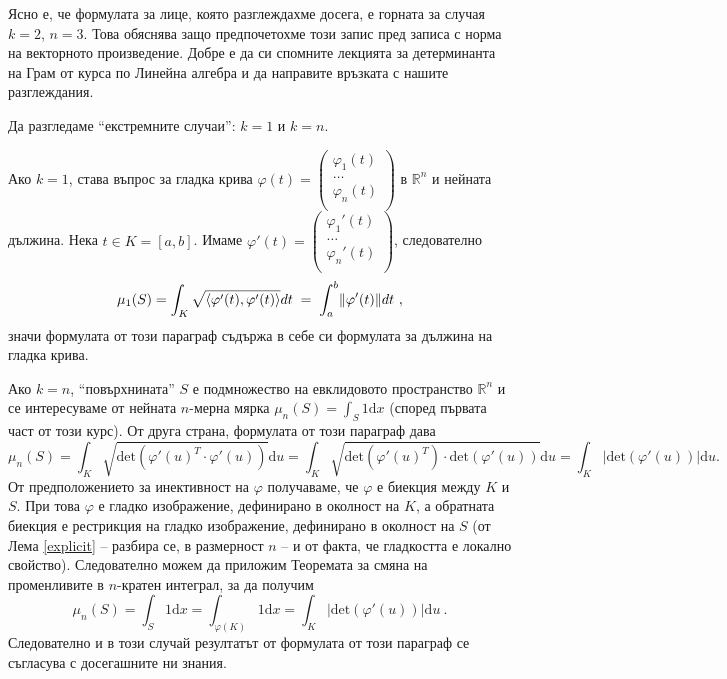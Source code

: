 \documentclass[11pt]{article}
\numberwithin{equation}{section}
\numberwithin{figure}{section}
\numberwithin{table}{section}
\theoremstyle{plain}
\theoremstyle{definition}
\theoremstyle{remark}
\theoremstyle{definition}
\theoremstyle{remark}
\theoremstyle{plain}
\theoremstyle{definition}
\theoremstyle{definition}
\theoremstyle{plain}
\theoremstyle{plain}
\theoremstyle{plain}
\theoremstyle{definition}
\theoremstyle{plain}
\DeclarePairedDelimiter\norm{\lVert}{\rVert}
\newcommand*{\R}{\mathbb{R}}
\begin{document}
\bigskip

Ясно е, че формулата за лице, която разглеждахме досега, е горната за случая $k=2$, $n=3$. Това обяснява защо предпочетохме този запис пред записа с норма на векторното произведение. Добре е да си спомните лекцията за детерминанта на Грам от курса по Линейна алгебра и да направите връзката с нашите разглеждания.

\bigskip

Да разгледаме ``екстремните случаи'': $k=1$ и $k=n$.

Ако $k=1$, става въпрос за гладка крива $\varphi(t) = \begin{pmatrix}
	\varphi_1(t)\\
	\dots\\
	\varphi_n(t)\\
\end{pmatrix}$ в $\R^n$ и нейната дължина. Нека $t\in K=[a,b]$. Имаме  $\varphi'(t) = \begin{pmatrix}
	\varphi_1'(t)\\
	\dots\\
	\varphi_n'(t)\\
\end{pmatrix}$, следователно
$$\mu_1(S) = \int_K \sqrt{\langle\varphi'(t),\varphi'(t)\rangle}dt \; = \; \int_a^b \norm{\varphi'(t)}dt \ ,$$
значи формулата от този параграф съдържа в себе си формулата за дължина на гладка крива.

Ако $k=n$, ``повърхнината'' $S$ е подмножество на евклидовото пространство $\R^n$ и се интересуваме от нейната $n$-мерна мярка $\mu_n (S)=\int_S 1 \textrm{d}x$ (според първата част от този курс). От друга страна, формулата от този параграф дава
$$\mu_n(S)= \int_K \sqrt{\textrm{det} \left( {\varphi'}(u)^T \cdot\varphi'(u)\right)}  \textrm{d}u = \int_K \sqrt{\textrm{det} \left({\varphi'}(u)^T \right)\cdot \textrm{det}\left(\varphi'(u)\right)}  \textrm{d}u =
 \int_K \left|\textrm{det}\left(\varphi'(u)\right)\right|  \textrm{d}u .$$
 От предположението за инективност на $\varphi$ получаваме, че $\varphi$ е биекция между $K$ и $S$. При това $\varphi$ е гладко изображение, дефинирано в околност на $K$, а обратната биекция е рестрикция на гладко изображение, дефинирано в околност на $S$ (от Лема \ref{explicit} -- разбира се, в размерност $n$ -- и от факта, че гладкостта е локално свойство). Следователно можем да приложим Теоремата за смяна на променливите в $n$-кратен интеграл, за да получим
 $$\mu_n (S)=\int_S 1 \textrm{d}x =\int_{\varphi(K)} 1 \textrm{d}x =\int_K \left|\textrm{det}\left(\varphi'(u)\right)\right|  \textrm{d}u \ .$$
 Следователно и в този случай резултатът от формулата от този параграф се съгласува с досегашните ни знания.
\end{document}
